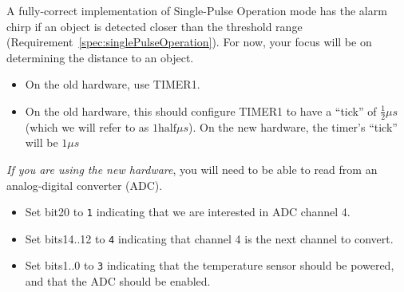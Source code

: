 A fully-correct implementation of Single-Pulse Operation mode has the alarm chirp if an object is detected closer than the threshold range (Requirement~\ref{spec:singlePulseOperation}).
For now, your focus will be on determining the distance to an object.

\begin{description}
        \begin{itemize}
            \item On the old hardware, use TIMER1.
            \item On the old hardware, this should configure TIMER1 to have a ``tick'' of $\frac{1}{2}\mu s$ (which we will refer to as $1\mathrm{half}\mu s$).
                On the new hardware, the timer's ``tick'' will be $1\mu s$
        \end{itemize}
\end{description}


\begin{description}
\end{description}

\textit{If you are using the new hardware}, you will need to be able to read from an analog-digital converter (ADC).
\begin{description}
        \begin{itemize}
            \item Set bit20 to \lstinline{1} indicating that we are interested in ADC channel 4.
            \item Set bits14..12 to \lstinline{4} indicating that channel 4 is the next channel to convert.
            \item Set bits1..0 to \lstinline{3} indicating that the temperature sensor should be powered, and that the ADC should be enabled.
        \end{itemize}
\end{description}


